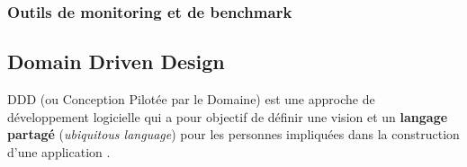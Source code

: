 	
	
	\subsubsection{Outils de monitoring et de benchmark}
	
\subsection{Domain Driven Design}
	
	\gls{DDD} (ou Conception Pilotée par le Domaine) est une approche de 
	développement logicielle qui a pour objectif de définir une vision et un 
	\textbf{langage partagé} (\textit{ubiquitous language}) pour les personnes 
	impliquées dans la construction d'une application \cite{Evans2003}. 
	
